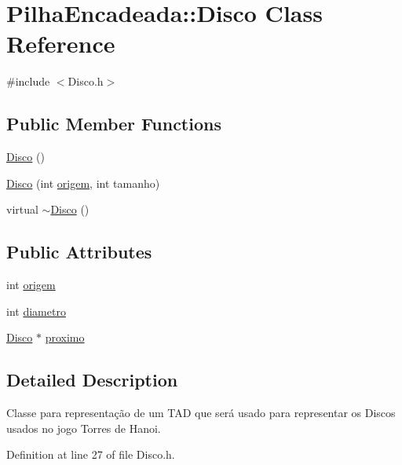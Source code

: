 \hypertarget{classPilhaEncadeada_1_1Disco}{
\section{PilhaEncadeada::Disco Class Reference}
\label{classPilhaEncadeada_1_1Disco}
}


{\ttfamily \#include $<$Disco.h$>$}

\subsection*{Public Member Functions}
\begin{DoxyCompactItemize}
\item 
\hyperlink{classPilhaEncadeada_1_1Disco_ad8afc755bd77c5356a59fba14b0bd0fb}{Disco} ()
\item 
\hyperlink{classPilhaEncadeada_1_1Disco_a16643aef7d276667da8f94c844d214fe}{Disco} (int \hyperlink{classPilhaEncadeada_1_1Disco_afd23fb89c412e394e695cef34a8dfba7}{origem}, int tamanho)
\item 
virtual \hyperlink{classPilhaEncadeada_1_1Disco_ae6592b54516b6510dfa8bd7031ee6031}{$\sim$Disco} ()
\end{DoxyCompactItemize}
\subsection*{Public Attributes}
\begin{DoxyCompactItemize}
\item 
int \hyperlink{classPilhaEncadeada_1_1Disco_afd23fb89c412e394e695cef34a8dfba7}{origem}
\item 
int \hyperlink{classPilhaEncadeada_1_1Disco_ac730ce96cec8f42ea0fab5b4460303f8}{diametro}
\item 
\hyperlink{classPilhaEncadeada_1_1Disco}{Disco} $\ast$ \hyperlink{classPilhaEncadeada_1_1Disco_af118ba39cf542407c27d9f23ece776ef}{proximo}
\end{DoxyCompactItemize}


\subsection{Detailed Description}
Classe para representação de um TAD que será usado para representar os Discos usados no jogo Torres de Hanoi. 

Definition at line 27 of file Disco.h.



